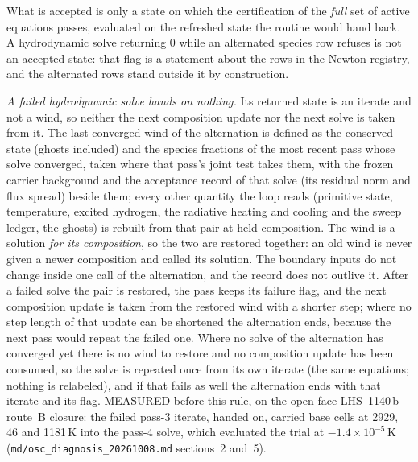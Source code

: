 What is accepted is only a state on which the certification of the
\emph{full} set of active equations passes, evaluated on the refreshed state
the routine would hand back.  A hydrodynamic solve returning 0 while an
alternated species row refuses is not an accepted state: that flag is a
statement about the rows in the Newton registry, and the alternated rows
stand outside it by construction.

\emph{A failed hydrodynamic solve hands on nothing.}  Its returned state is an
iterate and not a wind, so neither the next composition update nor the next
solve is taken from it.  The last converged wind of the alternation is
defined as the conserved state (ghosts included) and the species fractions
of the most recent pass whose solve converged, taken where that pass's joint
test takes them, with the frozen carrier background and the acceptance record
of that solve (its residual norm and flux spread) beside them; every other
quantity the loop reads (primitive state, temperature, excited hydrogen, the
radiative heating and cooling and the sweep ledger, the ghosts) is rebuilt
from that pair at held composition.  The wind is a solution \emph{for its
composition}, so the two are restored together: an old wind is never given a
newer composition and called its solution.  The boundary inputs do not change
inside one call of the alternation, and the record does not outlive it.  After
a failed solve the pair is restored, the pass keeps its failure flag, and the
next composition update is taken from the restored wind with a shorter step;
where no step length of that update can be shortened the alternation ends,
because the next pass would repeat the failed one.  Where no solve of the
alternation has converged yet there is no wind to restore and no composition
update has been consumed, so the solve is repeated once from its own iterate
(the same equations; nothing is relabeled), and if that fails as well the
alternation ends with that iterate and its flag.  MEASURED before this rule,
on the open-face LHS~1140\,b route~B closure: the failed pass-3 iterate,
handed on, carried base cells at 2929, 46 and 1181\,K into the pass-4 solve,
which evaluated the trial at $-1.4\times10^{-5}$\,K
(\texttt{md/osc\_diagnosis\_20261008.md} sections~2 and~5).

